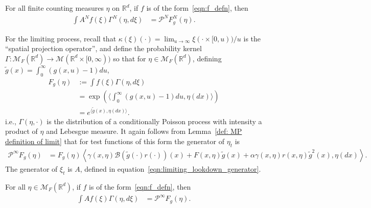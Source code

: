 \documentclass[EJP]{ejpecp} %
\newcommand{\IR}{\mathbb R}
\newcommand{\DG}{\mathcal{B}}  %
\newcommand{\Pgen}{\mathcal{P}}    %
\newcommand{\lp}{\xi}              %
\newcommand{\measures}{\mathcal{M}_F(\IR^d)} %
\newcommand{\flpmeasures}{\mathcal{M}(\IR^d \times [0,\infty))} %
\begin{document}
\begin{lemma}
    \label{lem:averaged_generators}
    For all finite counting measures $\eta$ on $\IR^d$,
    if $f$ is of the form~\eqref{eqn:f_defn}, then
    \begin{align}
        \int A^N f(\lp) \Gamma^N(\eta, d\lp)
        &=
        \Pgen^N F^N_g(\eta) .
    \end{align}
\end{lemma}

For the limiting process,
recall that $\kappa(\lp)(\cdot) = \lim_{u \to \infty} \lp(\cdot \times [0, u)) / u$
is the ``spatial projection operator'',
and define the probability kernel $\Gamma : \measures \to \flpmeasures$
so that for $\eta \in \measures$,
defining $\widetilde{g}(x) = \int_0^\infty (g(x, u) - 1) du$,
\begin{align*}
    F_g(\eta)
    &:=
    \int f(\lp) \Gamma(\eta, d\lp) \\
    &=
    \exp\left(
        \big \langle
            \int_0^\infty (g(x, u) - 1) du,
            \eta(dx)
        \big \rangle
    \right) \\
    &=
    e^{ \langle \widetilde{g}(x), \eta(dx) \rangle } .
\end{align*}
i.e., $\Gamma(\eta, \cdot)$ is the distribution of a conditionally Poisson process
with intensity a product of $\eta$ and Lebesgue measure.
It again follows from Lemma~\ref{def: MP definition of limit} that for test functions of this form
the generator of $\eta_t$ is
\begin{align} \label{eqn:pgen_infty}
    \Pgen^\infty F_g(\eta)
    &=
    F_g(\eta)
    \left\langle
        \gamma(x, \eta)
        \DG( \widetilde{g}(\cdot) r(\cdot) )(x)
        + F(x, \eta) \widetilde{g}(x)
        + \alpha \gamma(x, \eta) r(x, \eta) \widetilde{g}^2(x)
        ,
        \eta(dx)
    \right\rangle .
\end{align}
The generator of $\lp_t$ is $A$, defined in equation~\eqref{eqn:limiting_lookdown_generator}.

\begin{lemma}
    \label{lem:averaged_generators_limit}
    For all $\eta \in \measures$,
    if $f$ is of the form~\eqref{eqn:f_defn}, then
    \begin{align}
        \int A f(\lp) \Gamma(\eta, d\lp)
        &=
        \Pgen^\infty F_g(\eta) .
    \end{align}
\end{lemma}
\end{document}
